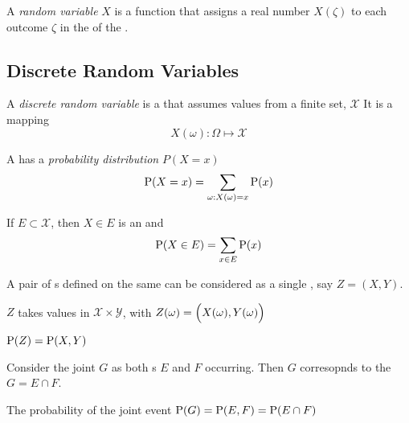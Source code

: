 \begin{definition}\label{def:Random_Variable}
  A \emph{random variable} $X$ is a function that assigns a real number $X(\zeta)$ to each outcome $\zeta$ in the  of the .
\end{definition}

\subsection{Discrete Random Variables}\label{subsec:Discrete_Random_Variables}
\begin{definition}\label{def:Discrete_Random_Variable}
  A \emph{discrete random variable} is a  that assumes values from a finite set, $\mathcal{X}$
  It is a mapping
  \begin{equation}\label{eq:Discrete_Random_Variable}
    X(\omega) : \Omega \mapsto \mathcal{X}
  \end{equation}
\end{definition}

\begin{definition}\label{def:Probability_Distribution}
  A  has a \emph{probability distribution} $P(X=x)$
  \begin{equation}\label{eq:Probability_Distribution}
    \operatorname{\operatorname{P}}(X=x) = \sum\limits_{\omega : X(\omega) = x} \operatorname{\operatorname{P}}(x)
  \end{equation}

  If $E \subset \mathcal{X}$, then $X \in E$ is an  and
  \begin{equation}\label{eq:7}
    \operatorname{\operatorname{P}}(X \in E) = \sum\limits_{x \in E} \operatorname{\operatorname{P}}(x)
  \end{equation}
\end{definition}

\begin{propertylist}
\item A pair of s defined on the same  can be considered as a single , say $Z = (X,Y)$.
\item $Z$ takes values in $\mathcal{X} \times \mathcal{Y}$, with $Z(\omega) = \Bigl( X(\omega), Y(\omega) \Bigr)$
\item $\operatorname{\operatorname{P}}(Z) = \operatorname{\operatorname{P}}(X,Y)$
\item Consider the joint  $G$ as both s $E$ and $F$ occurring. Then $G$ corresopnds to the  $G = E \cap F$.
\item The probability of the joint event $\operatorname{\operatorname{P}}(G) = \operatorname{\operatorname{P}}(E,F) = \operatorname{\operatorname{P}}(E \cap F)$
\end{propertylist}

